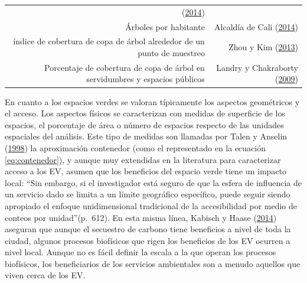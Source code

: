 \documentclass[12pt,a4paper,oneside, openany]{book}
\theoremstyle{definition}
\theoremstyle{definition}
\theoremstyle{definition}
\theoremstyle{remark}
\begin{document}
\begin{longtable}[]{@{}rr@{}}
\begin{minipage}[t]{0.31\columnwidth}
(\protect\hyperlink{ref-alanis_estructura_2014}{2014})\strut
\end{minipage}\tabularnewline
\begin{minipage}[t]{0.57\columnwidth}\raggedleft\strut
Árboles por habitante\strut
\end{minipage} & \begin{minipage}[t]{0.31\columnwidth}\raggedleft\strut
Alcaldía de Cali (\protect\hyperlink{ref-pot2014cali}{2014})\strut
\end{minipage}\tabularnewline
\begin{minipage}[t]{0.57\columnwidth}\raggedleft\strut
índice de cobertura de copa de árbol alrededor de un punto de
muestreo\strut
\end{minipage} & \begin{minipage}[t]{0.31\columnwidth}\raggedleft\strut
Zhou y Kim (\protect\hyperlink{ref-zhou_social_2013}{2013})\strut
\end{minipage}\tabularnewline
\begin{minipage}[t]{0.57\columnwidth}\raggedleft\strut
Porcentaje de cobertura de copa de árbol en servidumbres y espacios
públicos\strut
\end{minipage} & \begin{minipage}[t]{0.31\columnwidth}\raggedleft\strut
Landry y Chakraborty
(\protect\hyperlink{ref-landry_street_2009}{2009})\strut
\end{minipage}\tabularnewline
\bottomrule
\end{longtable}

En cuanto a los espacios verdes se valoran típicamente los aspectos
geométricos y el acceso. Los aspectos físicos se caracterizan con
medidas de superficie de los espacios, el porcentaje de área o número de
espacios respecto de las unidades espaciales del análisis. Este tipo de
medidas son llamadas por Talen y Anselin
(\protect\hyperlink{ref-talen_assessing_1998}{1998}) la aproximación
contenedor (como el representado en la ecuación \eqref{eq:contenedor}), y
aunque muy extendidas en la literatura para caracterizar acceso a los
EV, asumen que los beneficios del espacio verde tiene un impacto local:
``Sin embargo, si el investigador está seguro de que la esfera de
influencia de un servicio dado se limita a un límite geográfico
específico, puede seguir siendo apropiado el enfoque unidimensional
tradicional de la accesibilidad por medio de conteos por
unidad''(p.~612). En esta misma línea, Kabisch y Haase
(\protect\hyperlink{ref-kabisch_green_2014}{2014}) aseguran que aunque
el secuestro de carbono tiene beneficios a nivel de toda la ciudad,
algunos procesos biofísicos que rigen los beneficios de los EV ocurren a
nivel local. Aunque no es fácil definir la escala a la que operan los
procesos biofísicos, los beneficiarios de los servicios ambientales son
a menudo aquellos que viven cerca de los EV.
\end{document}
